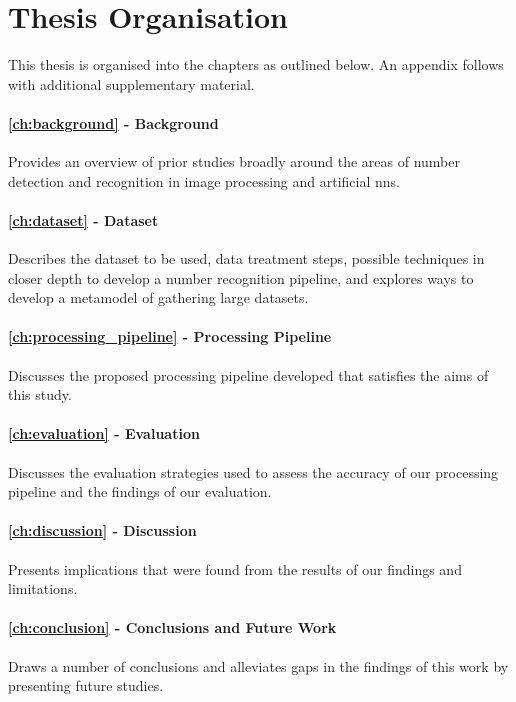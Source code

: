 \section{Thesis Organisation}
\label{sec:introduction:organisation}

This thesis is organised into the chapters as outlined below. An appendix follows with additional supplementary material.

\paragraph{\cref{ch:background} - Background} Provides an overview of prior studies broadly around the areas of number detection and recognition in image processing and artificial \glspl{nn}.

\paragraph{\cref{ch:dataset} - Dataset} Describes the dataset to be used, data treatment steps, possible techniques in closer depth to develop a number recognition pipeline, and explores ways to develop a metamodel of gathering large datasets.

\paragraph{\cref{ch:processing_pipeline} - Processing Pipeline} Discusses the proposed processing pipeline developed that satisfies the aims of this study.

\paragraph{\cref{ch:evaluation} - Evaluation} Discusses the evaluation strategies used to assess the accuracy of our processing pipeline and the findings of our evaluation.

\paragraph{\cref{ch:discussion} - Discussion} Presents implications that were found from the results of our findings and limitations.

\paragraph{\cref{ch:conclusion} - Conclusions and Future Work} Draws a number of conclusions and alleviates gaps in the findings of this work by presenting future studies.
